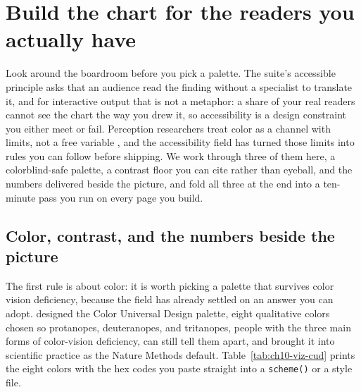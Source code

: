 \documentclass[
    a4paper,
    fontsize=10pt,
    twoside=true,
    numbers=noenddot,
]{kaobook}
\begin{document}
\section{Build the chart for the readers you actually have}\label{ch10-sec:a11y}
Look around the boardroom before you pick a palette. The suite's accessible principle asks that an audience read the finding without a specialist to translate it, and for interactive output that is not a metaphor: a share of your real readers cannot see the chart the way you drew it, so accessibility is a design constraint you either meet or fail. Perception researchers treat color as a channel with limits, not a free variable \parencite{franconeri2021science}, and the accessibility field has turned those limits into rules you can follow before shipping. We work through three of them here, a colorblind-safe palette, a contrast floor you can cite rather than eyeball, and the numbers delivered beside the picture, and fold all three at the end into a ten-minute pass you run on every page you build.

\subsection{Color, contrast, and the numbers beside the picture}\label{ch10-sec:a11y-rules}
The first rule is about color: it is worth picking a palette that survives color vision deficiency, because the field has already settled on an answer you can adopt. \textcite{okabeito2008cud} designed the Color Universal Design palette, eight qualitative colors chosen so protanopes, deuteranopes, and tritanopes, people with the three main forms of color-vision deficiency, can still tell them apart, and \textcite{wong2011color} brought it into scientific practice as the Nature Methods default. Table~\ref{tab:ch10-viz-cud} prints the eight colors with the hex codes you paste straight into a \texttt{scheme()} or a style file.
\end{document}
